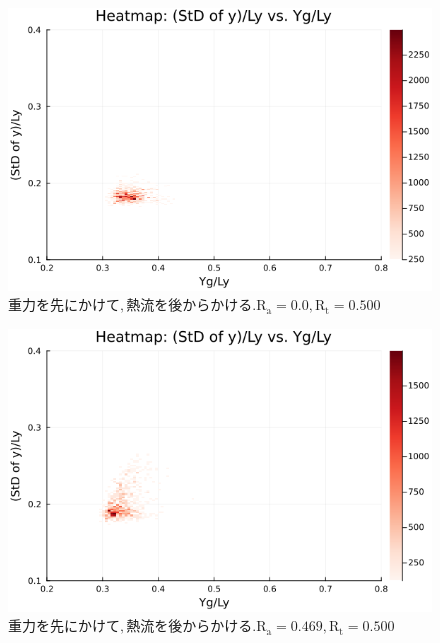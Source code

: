 \begin{figure}[H]
  \centering
  \includegraphics[scale=0.6]{image/RaRtmap_drop_heat/2023-12-21T10:44:58.621_RaRtmap_chi1.265_Ay50_rho0.4_T0.43_dT0.04_Rd0.0_Rt0.5_Ra0.0_g0.0003999718779659611_run4.0e7.png}
  \caption{$重力を先にかけて, 熱流を後からかける. \text{R}_\text{a}=0.0,\text{R}_\text{t}=0.500$}
  \label{}
\end{figure}

\begin{figure}[H]
  \centering
  \includegraphics[scale=0.6]{image/RaRtmap_drop_heat/2023-12-21T10:44:58.706_RaRtmap_chi1.265_Ay50_rho0.4_T0.43_dT0.04_Rd0.0_Rt0.5_Ra0.4693845_g0.0003999718779659611_run4.0e7.png}
  \caption{$重力を先にかけて, 熱流を後からかける. \text{R}_\text{a}=0.469,\text{R}_\text{t}=0.500$}
  \label{}
\end{figure}

